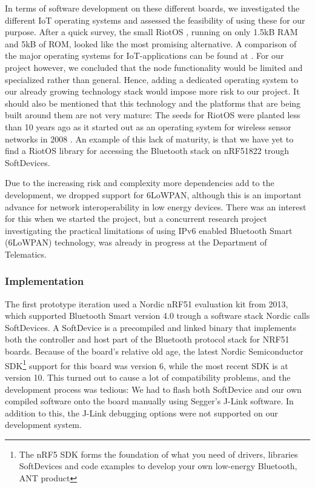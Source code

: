 In terms of software development on these different boards, we investigated the different IoT operating systems and assessed the feasibility of using these for our purpose. After a quick survey, the small RiotOS \cite{Anonymous:a1din1ZK}, running on only 1.5kB RAM and 5kB of ROM, looked like the most promising alternative. A comparison of the major operating systems for IoT-applications can be found at \cite{Anonymous:a1din1ZK}. For our project however, we concluded that the node functionality would be limited and specialized rather than general. Hence, adding a dedicated operating system to our already growing technology stack would impose more risk to our project. It should also be mentioned that this technology and the platforms that are being built around them are not very mature: The seeds for RiotOS were planted less than 10 years ago as it started out as an operating system for wireless sensor networks in 2008 \cite{newRef:52}. An example of this lack of maturity, is that we have yet to find a RiotOS library for accessing the Bluetooth stack on nRF51822 trough SoftDevices.

Due to the increasing risk and complexity more dependencies add to the development, we dropped support for 6LoWPAN, although this is an important advance for network interoperability in low energy devices. There was an interest for this when we started the project, but a concurrent research project investigating the practical limitations of using IPv6 enabled Bluetooth Smart (6LoWPAN) technology, was already in progress at the Department of Telematics.


\subsubsection{Implementation} %
\label{ssub:implementation}

The first prototype iteration used a Nordic nRF51 evaluation kit from 2013, which supported Bluetooth Smart version 4.0 trough a software stack Nordic calls SoftDevices. A SoftDevice is a precompiled and linked binary that implements both the controller and host part of the Bluetooth protocol stack for NRF51 boards. Because of the board's relative old age, the latest Nordic Semiconductor SDK\footnote{ The nRF5 SDK forms the foundation of what you need of drivers, libraries SoftDevices and code examples to develop your own low-energy Bluetooth, ANT product} support for this board was version 6, while the most recent SDK is at version 10. This turned out to cause a lot of compatibility problems, and the development process was tedious: We had to flash both SoftDevice and our own compiled software onto the board manually using Segger's J-Link software. In addition to this, the J-Link debugging options were not supported on our development system.

